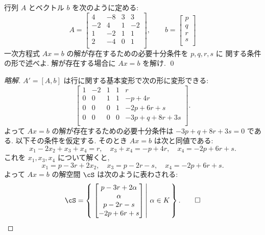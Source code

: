 \documentclass[12pt,twoside]{jarticle}
\newcommand\commentout[1]{#1}
\newcommand\commentout[1]{}
\begin{document}

\begin{question}[5点]
  \label{q:sol-inhom-3}
  行列 $A$ とベクトル $b$ を次のように定める:
  \begin{equation*}
    A = 
    \begin{bmatrix}
       4 & -8 & 3 &  3 \\
      -2 &  4 & 1 & -2 \\
       1 & -2 & 1 &  1 \\
       2 & -4 & 0 &  1 \\
    \end{bmatrix},
    \qquad
    b =
    \begin{bmatrix}
      p \\
      q \\
      r \\
      s \\
    \end{bmatrix}
  \end{equation*}
  一次方程式 $Ax=b$ の解が存在するための必要十分条件を $p,q,r,s$ に
  関する条件の形で述べよ.  解が存在する場合に $Ax=b$ を解け. \qed
\end{question}

\commentout{
\begin{proof}[略解]
  $A'=[A,b]$ は行に関する基本変形で次の形に変形できる:
  \begin{equation*}
    \left[
      \begin{array}{cccc|c}
        1 & -2 & 1 & 1 & r \\
        0 &  0 & 1 & 1 & -p+4r \\
        0 &  0 & 0 & 1 & -2p+6r+s \\
        0 &  0 & 0 & 0 & -3p+q+8r+3s \\
      \end{array}
    \right].
  \end{equation*}
  よって $Ax=b$ の解が存在するための必要十分条件は $-3p+q+8r+3s=0$ である.
  以下その条件を仮定する.  そのとき $Ax=b$ は次と同値である:
  \begin{equation*}
    x_1 - 2x_2 + x_3 + x_4 = r, \quad
    x_3 + x_4 = -p+4r, \quad
    x_4 = -2p+6r+s.
  \end{equation*}
  これを $x_1,x_3,x_4$ について解くと,
  \begin{equation*}
    x_1 = p-3r + 2x_2, \quad
    x_3 = p-2r-s, \quad
    x_4 = -2p+6r+s.
  \end{equation*}
  よって $Ax=b$ の解空間 $\cS$ は次のように表わされる:
  \begin{equation*}
    \cS =
    \left\{\,
      \left.
        \begin{bmatrix}
          p-3r + 2\alpha \\
          \alpha \\
          p-2r-s \\
          -2p+6r+s \\
        \end{bmatrix}
      \,\right|\,
      \alpha\in K
    \,\right\}.
    \qed
  \end{equation*}
\end{proof}
}
\end{document}
